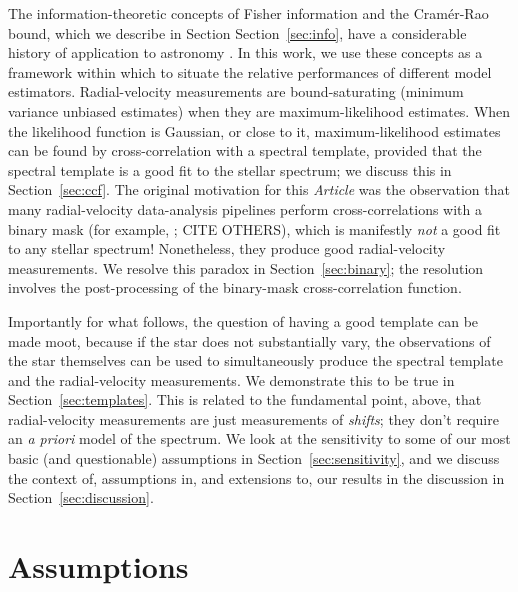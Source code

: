 \documentclass[modern]{aastex631}
\newcommand{\documentname}{\textsl{Article}}
\newcommand{\sectionname}{Section}
\newcommand{\secref}[1]{\sectionname~\ref{#1}}
\newcommand{\foreign}[1]{\textsl{#1}}
\begin{document}
The information-theoretic concepts of Fisher information and the Cram\'er-Rao bound, which we describe in Section \secref{sec:info}, have a considerable history of application to astronomy \citep{CITE}. 
In this work, we use these concepts as a framework within which to situate the relative performances of different model estimators. 
Radial-velocity measurements are bound-saturating (minimum variance unbiased estimates) when they are maximum-likelihood estimates.
When the likelihood function is Gaussian, or close to it, maximum-likelihood estimates can be found by cross-correlation with a spectral template, provided that the spectral template is a good fit to the stellar spectrum; we discuss this in \secref{sec:ccf}.
The original motivation for this \documentname{} was the observation that many radial-velocity data-analysis pipelines perform cross-correlations with a binary mask (for example, \citealt{pepe}; CITE OTHERS), which is manifestly \emph{not} a good fit to any stellar spectrum!
Nonetheless, they produce good radial-velocity measurements.
We resolve this paradox in \secref{sec:binary}; the resolution involves the post-processing of the binary-mask cross-correlation function.

Importantly for what follows, the question of having a good template can be made moot, because if the star does not substantially vary, the observations of the star themselves can be used to simultaneously produce the spectral template and the radial-velocity measurements.
We demonstrate this to be true in \secref{sec:templates}.
This is related to the fundamental point, above, that radial-velocity measurements are just measurements of \emph{shifts}; they don't require an \foreign{a priori} model of the spectrum.
We look at the sensitivity to some of our most basic (and questionable) assumptions in \secref{sec:sensitivity}, and we discuss the context of, assumptions in, and extensions to, our results in the discussion in \secref{sec:discussion}.

\section{Assumptions}\label{sec:assumptions}
\end{document}
